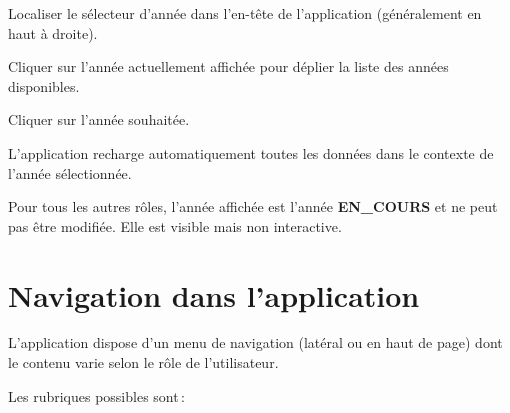 \begin{steps}
  \item Localiser le s\'electeur d'ann\'ee dans l'en-t\^ete de l'application (g\'en\'eralement en haut \`a droite).
  \item Cliquer sur l'ann\'ee actuellement affich\'ee pour d\'eplier la liste des ann\'ees disponibles.
  \item Cliquer sur l'ann\'ee souhait\'ee.
  \item L'application recharge automatiquement toutes les donn\'ees dans le contexte de l'ann\'ee s\'electionn\'ee.
\end{steps}


\begin{notebox}
  Pour tous les autres r\^oles, l'ann\'ee affich\'ee est l'ann\'ee \textbf{EN\_COURS} et ne peut pas \^etre modifi\'ee. Elle est visible mais non interactive.
\end{notebox}

\section{Navigation dans l'application}

L'application dispose d'un menu de navigation (lat\'eral ou en haut de page) dont le contenu varie selon le r\^ole de l'utilisateur.

Les rubriques possibles sont\,:

